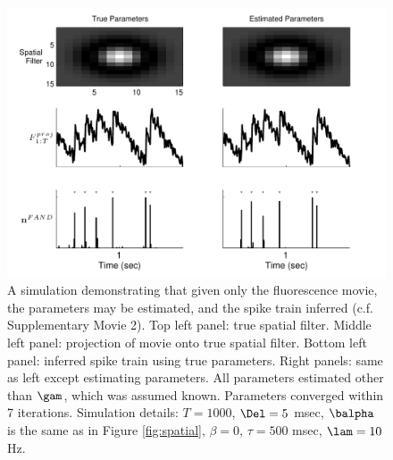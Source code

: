 \begin{figure}[h!]
\centering \includegraphics[width=.9\linewidth]{../figs/spatial_EM}
\caption{A simulation demonstrating that given only the fluorescence movie, the parameters may be estimated, and the spike train inferred (c.f. Supplementary Movie 2). Top left panel: true spatial filter.  Middle left panel: projection of movie onto true spatial filter. Bottom left panel: inferred spike train using true parameters. Right panels: same as left except estimating parameters.  All parameters estimated other than $\gam$, which was assumed known.  Parameters converged within 7 iterations.  Simulation details: $T=1000$, $\Del=5$ msec, $\balpha$ is the same as in Figure \ref{fig:spatial}, $\beta=0$, $\tau=500$ msec, $\lam=10$ Hz.} \label{fig:spatial_EM}
\end{figure}

